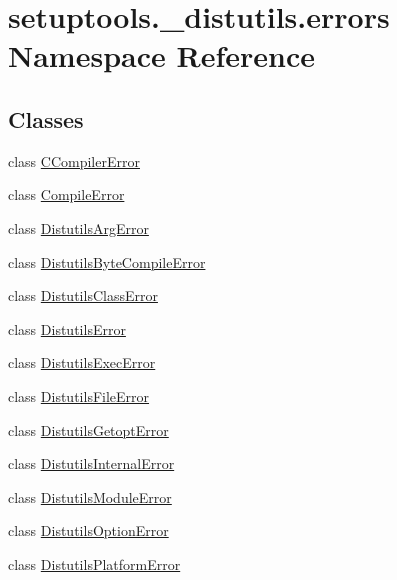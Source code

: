 \hypertarget{namespacesetuptools_1_1__distutils_1_1errors}{}\section{setuptools.\+\_\+distutils.\+errors Namespace Reference}
\label{namespacesetuptools_1_1__distutils_1_1errors}
\subsection*{Classes}
\begin{DoxyCompactItemize}
\item 
class \hyperlink{classsetuptools_1_1__distutils_1_1errors_1_1CCompilerError}{C\+Compiler\+Error}
\item 
class \hyperlink{classsetuptools_1_1__distutils_1_1errors_1_1CompileError}{Compile\+Error}
\item 
class \hyperlink{classsetuptools_1_1__distutils_1_1errors_1_1DistutilsArgError}{Distutils\+Arg\+Error}
\item 
class \hyperlink{classsetuptools_1_1__distutils_1_1errors_1_1DistutilsByteCompileError}{Distutils\+Byte\+Compile\+Error}
\item 
class \hyperlink{classsetuptools_1_1__distutils_1_1errors_1_1DistutilsClassError}{Distutils\+Class\+Error}
\item 
class \hyperlink{classsetuptools_1_1__distutils_1_1errors_1_1DistutilsError}{Distutils\+Error}
\item 
class \hyperlink{classsetuptools_1_1__distutils_1_1errors_1_1DistutilsExecError}{Distutils\+Exec\+Error}
\item 
class \hyperlink{classsetuptools_1_1__distutils_1_1errors_1_1DistutilsFileError}{Distutils\+File\+Error}
\item 
class \hyperlink{classsetuptools_1_1__distutils_1_1errors_1_1DistutilsGetoptError}{Distutils\+Getopt\+Error}
\item 
class \hyperlink{classsetuptools_1_1__distutils_1_1errors_1_1DistutilsInternalError}{Distutils\+Internal\+Error}
\item 
class \hyperlink{classsetuptools_1_1__distutils_1_1errors_1_1DistutilsModuleError}{Distutils\+Module\+Error}
\item 
class \hyperlink{classsetuptools_1_1__distutils_1_1errors_1_1DistutilsOptionError}{Distutils\+Option\+Error}
\item 
class \hyperlink{classsetuptools_1_1__distutils_1_1errors_1_1DistutilsPlatformError}{Distutils\+Platform\+Error}

\end{DoxyCompactItemize}

